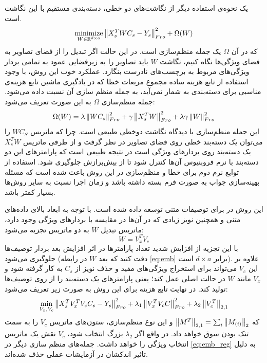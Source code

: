 یک نحوه‌ی استفاده دیگر از نگاشت‌های دو خطی، دسته‌بندی مستقیم با این نگاشت است.
\begin{equation}
\operatorname*{minimize}_{W \in \mathbb{R}^{d \times a}} \left \lVert X_s^T WC_s - Y_s \right \rVert_{Fro}^2 + \Omega(W) \label{eq:emb}
\end{equation}
که در آن $\Omega$ یک جمله منظم‌سازی است.
در این حالت اگر تبدیل را از فضای تصاویر به فضای ویژگی‌ها نگاه کنیم، نگاشت $W$ باید تصاویر را به زیرفضایی عمود به تمامی بردار ویژگی‌های مربوط به برچسب‌های نادرست بنگارد.
عملکرد خوب این روش، با وجود استفاده از تابع هزینه ساده مجموع مربعات خطا که در یادگیری ماشین تابع هزینه‌ی مناسبی برای دسته‌بندی به شمار نمی‌آید، به جمله منظم سازی آن نسبت داده می‌شود. جمله منظم‌سازی $\Omega$ به این صورت تعریف می‌شود:
\begin{equation} \label{eq:emb_reg}
\Omega(W) = \lambda \left \lVert WC_s \right \rVert_{Fro}^2 + \gamma \left \lVert X_s^T W \right \rVert_{Fro}^2  + \lambda \gamma \left \lVert W \right \rVert_{Fro}^2
\end{equation}
این جمله منظم‌سازی با دیدگاه نگاشت دوخطی طبیعی است. چرا که ماتریس $WC_S$ را می‌توان یک دسته‌بند خطی روی فضای تصاویر در نظر گرفت و از طرفی ماتریس $X_s^T W$ یک دسته‌بند روی بردارهای ویژگی است در نتیجه طبیعی است که پارامترهای این دو دسته‌بند با نرم فروبنیوس آن‌ها کنترل شود تا از بیش‌‌برازش
 جلوگیری شود.
استفاده از توابع نرم دوم برای خطا و منظم‌سازی در این روش باعث شده است که مسئله بهینه‌سازی جواب به صورت فرم بسته داشته باشد و زمان اجرا نسبت به سایر روش‌ها بسیار کمتر باشد.

این روش در
\cite{lessismore}
برای توصیفات متنی توسعه داده شده است. با توجه به ابعاد بالای داده‌های متنی و همچنین نویز زیادی که در آن‌ها در مقایسه با بردارهای ویژگی وجود دارد، ماتریس تبدیل $W$ به دو ماتریس تجزیه می‌شود:
\begin{equation}
W = V_x^T V_c
\end{equation}
با این تجزیه از افزایش شدید تعداد پارامترها در اثر افزایش بعد بردار توصیف‌ها جلوگیری می‌شود (دقت کنید که بعد  $W$ در رابطه \eqref{eq:emb} برابر $d\times a$ است). علاوه بر این $V_c$ می‌تواند برای استخراج ویژگی‌های مفید و حذف نویز از  $C_s$ به  کار گرفته شود و $V_x$ مانند $W$ در حالت اصلی عمل کند؛ یعنی پارامترهای یک دسته‌بند را از روی توصیف‌ها تولید کند. در نهایت تابع هزینه برای این روش به صورت زیر تعریف می‌شود:
\begin{equation}
\min_{V_x, V_c} \left \lVert X_s^T V_x^T V_c C_s - Y_s \right \rVert_{Fro}^2 + \lambda_1 \left \lVert  V_x^T V_c C \right \rVert_{Fro}^2 +
\lambda_2 \left \lVert V_c^T \right \rVert_{2,1}
\end{equation}
که
$\left \lVert M^T \right \rVert_{2,1} = \sum_i \left \lVert M_{(i)} \right \rVert_2 $
و این نوع منظم‌سازی، ستون‌های ماتریس $V_c$ را به سمت تنک بودن سوق خواهد داد. در واقع اگر $\lambda_2$ بزرگ انتخاب شود، $V_c$ نقش یک ماتریس انتخاب ویژگی
را خواهد داشت. جمله‌های منظم سازی دیگر در
\eqref{eq:emb_reg}
به دلیل تاثیر اندکشان در آزمایشات عملی حذف شده‌اند.


